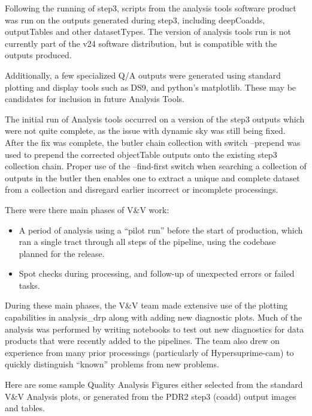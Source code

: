 Following the running of step3, scripts from the analysis tools software product
was run on the outputs generated during step3, including deepCoadds, outputTables and other
datasetTypes. The version of analysis tools run is not currently part of the v24 software distribution,
but is compatible with the outputs produced.

Additionally, a few specialized Q/A outputs were generated using standard plotting and display
tools such as DS9, and python's matplotlib.  These may be candidates for inclusion in future 
Analysis Tools.

The initial run of Analysis tools occurred on a version of the step3 outputs which were not
quite complete, as the issue with dynamic sky was still being fixed.  
After the fix was complete,  the butler chain collection with switch --prepend was used to
prepend the corrected objectTable outputs onto the existing step3 collection chain.
Proper use of the --find-first switch when searching a collection of outputs in the butler then
enables one to extract a unique and complete dataset from a collection and disregard earlier incorrect or 
incomplete processings.

There were there main phases of V\&V work:

\begin{itemize}
\item A period of analysis using a “pilot run” before the start of production, which ran a single
tract through all steps of the pipeline, using the codebase planned for the release.
\item Spot checks during processing, and follow-up of unexpected errors or failed tasks.
\end{itemize}

During these main phases, the V\&V team made extensive use of the plotting capabilities in
analysis\_drp along with adding new diagnostic plots. Much of the analysis was performed by writing
notebooks to test out new diagnostics for data products that were recently added to the pipelines.
The team also drew on experience from many prior processings (particularly of Hypersuprime-cam) to
quickly distinguish ``known'' problems from new problems.

Here are some sample Quality Analysis Figures either selected from the 
standard V\&V Analysis plots, or generated from the PDR2 step3 (coadd) 
output images and tables.

